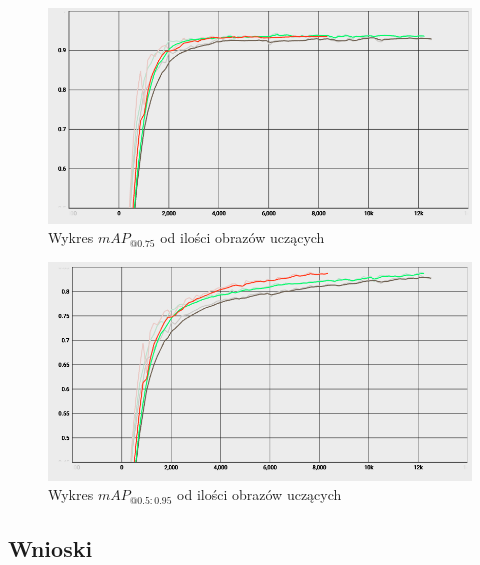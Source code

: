 \documentclass{article}
\begin{document}
\begin{figure}[!h]
    \centering \includegraphics[width=1\linewidth]{map_0_75}
    \caption{Wykres $mAP_{@0.75}$ od ilości obrazów uczących}
    \label{fig:map_0_75}
\end{figure}

\begin{figure}[!h]
    \centering \includegraphics[width=1\linewidth]{map_0_5_0_95}
    \caption{Wykres $mAP_{@0.5:0.95}$ od ilości obrazów uczących}
    \label{fig:map_0_5_0_95}
\end{figure}

\FloatBarrier

\subsection{Wnioski}
\end{document}
